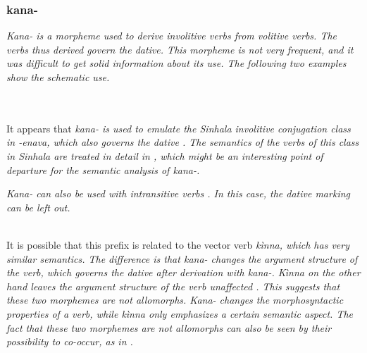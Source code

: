 \subsubsection{kana-}\label{sec:morph:kana-}

\em Kana- \em is a morpheme used to derive involitive verbs from volitive verbs. The verbs thus derived govern the dative.  This morpheme is not very frequent, and it was difficult to get solid information about its use. The following two examples show the schematic use. 


 \\ 
 \\
It appears that \em kana- \em is used to emulate the Sinhala involitive conjugation class in \em -enava\em, which also governs the dative \citep{abc}. The semantics of the verbs of this class in Sinhala are treated in detail in \citep{Gair}, which might be an interesting point of departure for the semantic analysis of \em kana-\em.

\em Kana- \em can also be used with intransitive verbs . In this case, the dative marking can be left out.

 \\
It is possible that this prefix is related to the vector verb \em kìnna\em, which has very similar semantics. The difference is that \em kana- \em changes the argument structure of the verb, which governs the dative after derivation with \em kana-\em. \em Kìnna \em on the other hand leaves the argument structure of the verb unaffected . This suggests that these two morphemes are not allomorphs. \em Kana- \em changes the morphosyntactic properties of a verb, while \em kìnna \em only emphasizes a certain semantic aspect. The fact that these two morphemes are not allomorphs can also be seen by their possibility to co-occur, as in .

